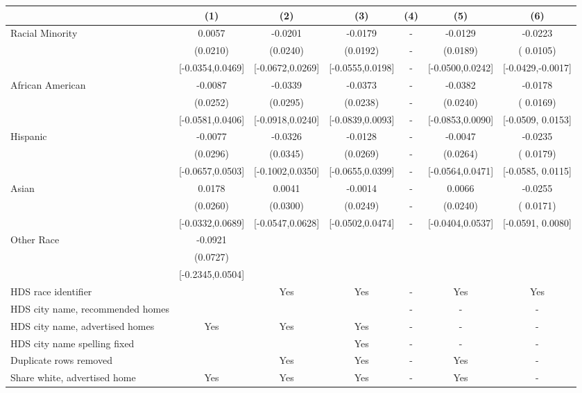 \begin{table}[htbp]
{\begin{tabular}{l*{6}{c}}
                    \cmidrule(lr){2-2}\cmidrule(lr){3-3}\cmidrule(lr){4-4}\cmidrule(lr){5-5}\cmidrule(lr){6-6}\cmidrule(lr){7-7}
                    &\multicolumn{1}{c}{(1)}   &\multicolumn{1}{c}{(2)}   &\multicolumn{1}{c}{(3)}   &\multicolumn{1}{c}{(4)}   &\multicolumn{1}{c}{(5)}   &\multicolumn{1}{c}{(6)}\\
\midrule
Racial Minority & 0.0057 & -0.0201 & -0.0179 & - & -0.0129 & -0.0223\sym{**} \\
 & (0.0210) & (0.0240) & (0.0192) & - & (0.0189) & ( 0.0105) \\
 & [-0.0354,0.0469] & [-0.0672,0.0269] & [-0.0555,0.0198] & - & [-0.0500,0.0242] & [-0.0429,-0.0017] \\
\midrule
African American & -0.0087 & -0.0339 & -0.0373 & - & -0.0382 & -0.0178 \\
 & (0.0252) & (0.0295) & (0.0238) & - & (0.0240) & ( 0.0169) \\
 & [-0.0581,0.0406] & [-0.0918,0.0240] & [-0.0839,0.0093] & - & [-0.0853,0.0090] & [-0.0509, 0.0153] \\
Hispanic & -0.0077 & -0.0326 & -0.0128 & - & -0.0047 & -0.0235 \\
 & (0.0296) & (0.0345) & (0.0269) & - & (0.0264) & ( 0.0179) \\
 & [-0.0657,0.0503] & [-0.1002,0.0350] & [-0.0655,0.0399] & - & [-0.0564,0.0471] & [-0.0585, 0.0115] \\
Asian & 0.0178 & 0.0041 & -0.0014 & - & 0.0066 & -0.0255 \\
 & (0.0260) & (0.0300) & (0.0249) & - & (0.0240) & ( 0.0171) \\
 & [-0.0332,0.0689] & [-0.0547,0.0628] & [-0.0502,0.0474] & - & [-0.0404,0.0537] & [-0.0591, 0.0080] \\
Other Race & -0.0921 &  &  &  &  &  \\
 & (0.0727) &  &  &  &  &  \\
 & [-0.2345,0.0504] &  &  &  &  &  \\
\midrule
HDS race identifier & & Yes & Yes & - & Yes & Yes \\
HDS city name, recommended homes &  &  &  &- & - & -\\
HDS city name, advertised homes & Yes & Yes & Yes & - & - & -\\
HDS city name spelling fixed & & & Yes & - & - & -\\
Duplicate rows removed &  & Yes & Yes & - & Yes & - \\
\midrule
Share white, advertised home  & Yes & Yes & Yes & - & Yes & - \\

\end{tabular}}
\end{table}

